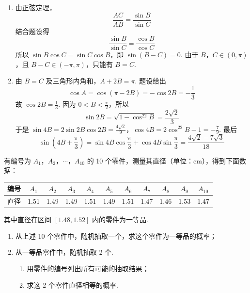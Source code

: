 \begin{solution}
\begin{enumerate}
\item 由正弦定理，
\[
\frac{AC}{AB}=\frac{\sin B}{\sin C}
\]
结合题设得
\[
\frac{\sin B}{\sin C}=\frac{\cos B}{\cos C}
\]
所以 \(\sin B\cos C=\sin C\cos B\)，即 \(\sin(B-C)=0\). 由于 \(B\)，\(C\in(0,\pi)\)，且 \(B-C\in(-\pi,\pi)\)，只能有 \(B=C\).

\item 由 \(B=C\) 及三角形内角和，\(A+2B=\pi\). 题设给出
\[
\cos A=\cos(\pi-2B)=-\cos2B=-\frac13
\]
故 \(\cos2B=\frac13\). 因为 \(0<B<\frac{\pi}{2}\)，所以
\[
\sin2B=\sqrt{1-\cos^22B}=\frac{2\sqrt2}{3}
\]
于是
\(\sin4B=2\sin2B\cos2B=\frac{4\sqrt2}{9}\)，\(\cos4B=2\cos^22B-1=-\frac79\).
最后
\[
\sin\left(4B+\frac{\pi}{3}\right)
=\sin4B\cos\frac{\pi}{3}+\cos4B\sin\frac{\pi}{3}
=\frac{4\sqrt2-7\sqrt3}{18}
\]
\end{enumerate}
\end{solution}

\begin{problem}
有编号为 \(A_1\)，\(A_2\)，\(\cdots\)，\(A_{10}\) 的 10 个零件，测量其直径（单位：\(\mathrm{cm}\)），得到下面数据：

\begin{center}
\begin{tabular}{|c|*{10}{c|}}
\hline
编号 & \(A_1\) & \(A_2\) & \(A_3\) & \(A_4\) & \(A_5\) & \(A_6\) & \(A_7\) & \(A_8\) & \(A_9\) & \(A_{10}\) \\
\hline
直径 & 1.51 & 1.49 & 1.49 & 1.51 & 1.49 & 1.51 & 1.47 & 1.46 & 1.53 & 1.47 \\
\hline
\end{tabular}
\end{center}

其中直径在区间 \([1.48,1.52]\) 内的零件为一等品.

\begin{enumerate}
\item 从上述 10 个零件中，随机抽取一个，求这个零件为一等品的概率；
\item 从一等品零件中，随机抽取 2 个.

\begin{enumerate}
\item 用零件的编号列出所有可能的抽取结果；
\item 求这 2 个零件直径相等的概率.
\end{enumerate}
\end{enumerate}
\end{problem}

